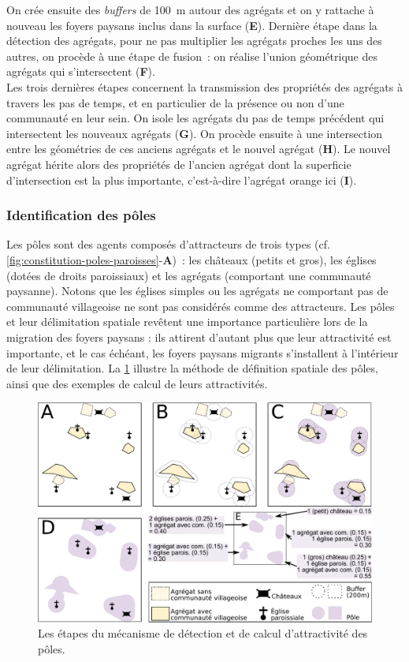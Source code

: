 On crée ensuite des \textit{buffers} de 100~m autour des agrégats et on y rattache à nouveau les foyers paysans inclus dans la surface (\textbf{E}).
Dernière étape dans la détection des agrégats, pour ne pas multiplier les agrégats proches les uns des autres, on procède à une étape de fusion : on réalise l'union géométrique des agrégats qui s'intersectent (\textbf{F}).\\
Les trois dernières étapes concernent la transmission des propriétés des agrégats à travers les pas de temps, et en particulier de la présence ou non d'une communauté en leur sein.
On isole les agrégats du pas de temps précédent qui intersectent les nouveaux agrégats (\textbf{G}).
On procède ensuite à une intersection entre les géométries de ces anciens agrégats et le nouvel agrégat (\textbf{H}).
Le nouvel agrégat hérite alors des propriétés de l'ancien agrégat dont la superficie d'intersection est la plus importante, c'est-à-dire l'agrégat orange ici (\textbf{I}).
	
\subsubsection{Identification des pôles \label{sssec:poles}}

Les pôles sont des agents composés d'attracteurs de trois types (cf. \cref{fig:constitution-poles-paroisses}-\textbf{A}) : les châteaux (petits et gros), les églises (dotées de droits paroissiaux) et les agrégats (comportant une communauté paysanne).
Notons que les églises simples ou les agrégats ne comportant pas de communauté villageoise ne sont pas considérés comme des attracteurs.
Les pôles et leur délimitation spatiale revêtent une importance particulière lors de la migration des foyers paysans : ils attirent d'autant plus que leur attractivité est importante, et le cas échéant, les foyers paysans migrants s'installent à l'intérieur de leur délimitation.
La \cref{fig:detection-poles} illustre la méthode de définition spatiale des pôles, ainsi que des exemples de calcul de leurs attractivités.

\begin{figure}[H]
	\centering
	\includegraphics[width=\linewidth]{img/detection_poles.pdf}
	\caption{Les étapes du mécanisme de détection et de calcul d'attractivité des pôles.}
	\label{fig:detection-poles}
\end{figure}

